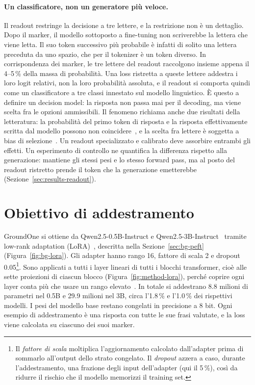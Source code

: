 \paragraph{Un classificatore, non un generatore più veloce.} Il readout restringe la decisione a tre lettere, e la
restrizione non è un dettaglio. Dopo il marker, il modello sottoposto a fine-tuning non scriverebbe la lettera che viene
letta. Il suo token successivo più probabile è infatti di solito una lettera preceduta da uno spazio, che per il tokenizer è
un token diverso. In corrispondenza dei marker, le tre lettere del readout raccolgono insieme appena il 4--5\,\% della massa di probabilità. Una loss ristretta a queste lettere addestra i loro logit relativi, non la loro probabilità
assoluta, e il readout si comporta quindi come un classificatore a tre classi innestato sul modello linguistico. È
questo a definire un decision model: la risposta non passa mai per il decoding, ma viene scelta fra le opzioni ammissibili.
Il fenomeno richiama anche due risultati della letteratura: la probabilità del primo token di risposta e la risposta
effettivamente scritta dal modello possono non coincidere~\cite{wang2024myanswerc}, e la scelta fra lettere è soggetta a
bias di selezione~\cite{zheng2024mcq}. Un readout specializzato e calibrato deve assorbire entrambi gli effetti. Un
esperimento di controllo ne quantifica la differenza rispetto alla generazione: mantiene gli stessi pesi e lo stesso
forward pass, ma al posto del readout ristretto prende il token che la generazione emetterebbe
(Sezione~\ref{sec:results-readout}).


\section{Obiettivo di addestramento}
\label{sec:method-training}

GroundOne si ottiene da Qwen2.5-0.5B-Instruct e Qwen2.5-3B-Instruct~\cite{qwen2024qwen25} tramite low-rank adaptation
(LoRA)~\cite{hu2022lora}, descritta nella Sezione~\ref{sec:bg-peft} (Figura~\ref{fig:bg-lora}). Gli adapter hanno rango 16, fattore di scala 2 e dropout 0.05\footnote{Il \emph{fattore di
scala} moltiplica l'aggiornamento calcolato dall'adapter prima di sommarlo all'output dello strato congelato. Il
\emph{dropout} azzera a caso, durante l'addestramento, una frazione degli input dell'adapter (qui il 5\,\%), così da
ridurre il rischio che il modello memorizzi il training set.}. Sono applicati a tutti i layer lineari di tutti i blocchi
transformer, cioè alle sette proiezioni di ciascun blocco (Figura~\ref{fig:method-lora}), perché coprire ogni layer
conta più che usare un rango elevato~\cite{dettmers2023qlora}. In totale si addestrano 8.8 milioni di parametri nel
0.5B e 29.9 milioni nel 3B, circa l'1.8\,\% e l'1.0\,\% dei rispettivi modelli. I pesi del modello
base restano congelati in precisione a 8 bit. Ogni esempio di addestramento è una risposta con tutte le sue frasi
valutate, e la loss viene calcolata su ciascuno dei suoi marker.

